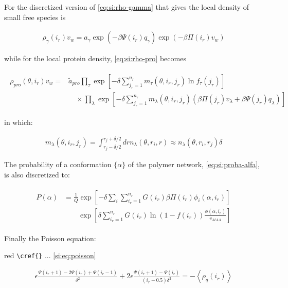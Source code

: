\documentclass[journal=jacsat,manuscript=suppinfo]{achemso}
\begin{document}
For the discretized version of \cref{eq:si:rho-gamma} that gives the local density of small free species is

\begin{align}
	\rho_\gamma(i_r)v_w = a_\gamma \exp{\left(-\beta \Psi(i_r)q_\gamma\right)} \exp{\left(-\beta\Pi(i_r) v_w\right)}
\end{align}



while for the local protein density, \cref{eq:si:rho-pro} becomes



\begin{align}
	\begin{aligned}
		\rho_{pro}(\theta, i_r)v_w = &\tilde{a}_{pro} \prod_\tau\exp\left[- \delta \sum^{n_r}_{j_r = 1} m_\tau(\theta,i_r,j_r) \ln f_\tau(j_r)\right] \\
		& \hspace{1em} \times \prod_\lambda \exp \left[- \delta \sum^{n_r}_{j_r = 1} m_\lambda(\theta,i_r, j_r)\left(\beta\Pi(j_r) v_\lambda+ \beta \Psi(j_r)q_\lambda\right) \right]
	\end{aligned}
\end{align}

\noindent in which:

\begin{align}
	m_\lambda(\theta,i_r,j_r) =\int_{r_j -\delta/2}^{r_j + \delta/2} dr n_\lambda(\theta, r_i, r) \approx  n_\lambda(\theta, r_i, r_j) \delta
\end{align}


The probability of a conformation $\{\alpha\}$ of the polymer network, \ref{eq:si:proba-alfa}, is also discretized to:

\begin{align}
	\begin{aligned}
		P(\alpha)&=\frac{1}{Q}\exp\left[- \delta\sum_i{\sum_{i_r =1}^{n_r}{G(i_r)\beta\Pi(i_r)\phi_i(\alpha,i_r)}}\right] \\
		&\hspace{2em} \exp\left[\delta\sum_{i_r =1}^{n_r}{G(i_r)\ln(1-f(i_r))\frac{\phi(\alpha,i_r)}{v_{MAA}}}\right]
	\end{aligned}
\end{align}

Finally the Poisson equation:
\begin{color}{red}
	\verb|\cref{}| ... \ref{si:eq:poisson}
\end{color}

\begin{align}
	\epsilon \frac{\Psi(i_r +1) -2 \Psi(i_r) + \Psi(i_r -1)}{\delta ^2} + 2\epsilon \frac{\Psi(i_r +1) -\Psi(i_r)}{(i_r -0.5)\delta ^2}= -\left<\rho_q(i_r)\right>
	\label{si:eq:poisson-ir}
\end{align}
\end{document}
